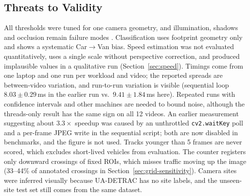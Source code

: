 \documentclass[conference]{IEEEtran}
\newcommand{\code}[1]{\texttt{#1}}
\begin{document}
\subsection{Threats to Validity}
\label{sec:threats}
All thresholds were tuned for one camera geometry, and illumination,
shadows and occlusion remain failure modes \cite{abbas2021,chen2020}.
Classification uses footprint geometry only and shows a systematic
Car$\to$Van bias. Speed estimation was not evaluated quantitatively, uses
a single scale without perspective correction, and produced implausible
values in a qualitative run (Section~\ref{sec:speed}).
Timings come from one laptop and one run per workload and video; the
reported spreads are between-video variation, and run-to-run variation is
visible (sequential loop $8.03\pm0.29$\,ms in the earlier run vs.\
$9.41\pm1.84$\,ms here). Repeated runs with confidence intervals
\cite{kalibera2013} and other machines are needed to bound noise, although
the threads-only result has the same sign on all 12 videos. An earlier
measurement suggesting about $3.3\times$ speedup was caused by an
unthrottled \code{cv2.waitKey} poll and a per-frame JPEG write in the
sequential script; both are now disabled in benchmarks, and the figure is
not used. Tracks younger than 5 frames are never scored, which excludes
short-lived vehicles from evaluation. The counter registers only downward crossings of
fixed ROIs, which misses traffic moving up the image (33--44\% of
annotated crossings in Section~\ref{sec:grid-sensitivity}). Camera sites
were inferred visually because UA-DETRAC has no site labels, and the
unseen-site test set still comes from the same dataset.
\end{document}
